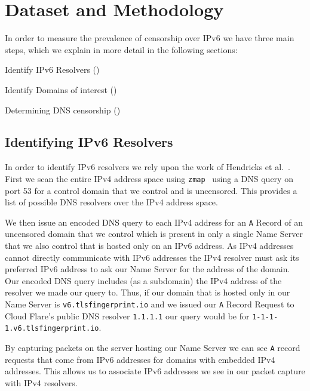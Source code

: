 \section{Dataset and Methodology}\label{sec:methodology}

In order to measure the prevalence of censorship over IPv6 we have three main
steps, which we explain in more detail in the following sections:
\begin{packed_enumerate}
    \item Identify IPv6 Resolvers ()
    \item Identify Domains of interest ()
    \item Determining DNS censorship ()
\end{packed_enumerate}


\subsection{Identifying IPv6 Resolvers}\label{ssec:ipv6-resolvers} 

In order to identify IPv6 resolvers we rely upon the work of Hendricks et
al.~\cite{hendriks2017potential}. First we scan the entire IPv4 address space
using \texttt{zmap}~\cite{Durumeric13zmap} using a DNS query on port 53 for a
control domain that we control and is uncensored. This provides a list of
possible DNS resolvers over the IPv4 address space. 

We then issue an encoded DNS query to each IPv4 address for an \texttt{A} Record
of an uncensored domain that we control which is present in only a single Name
Server that we also control that is hosted only on an IPv6 address. As IPv4
addresses cannot directly communicate with IPv6 addresses the IPv4 resolver must
ask its preferred IPv6 address to ask our Name Server for the address of the
domain. Our encoded DNS query includes (as a subdomain) the IPv4 address of the
resolver we made our query to. Thus, if our domain that is hosted only in our
Name Server is \texttt{v6.tlsfingerprint.io} and we issued our \texttt{A} Record
Request to Cloud Flare's public DNS resolver \texttt{1.1.1.1} our query would be
for \texttt{1-1-1-1.v6.tlsfingerprint.io}.

By capturing packets on the server hosting our Name Server we can see \texttt{A}
record requests that come from IPv6 addresses for domains with embedded IPv4
addresses. This allows us to associate IPv6 addresses we see in our packet
capture with IPv4 resolvers.

